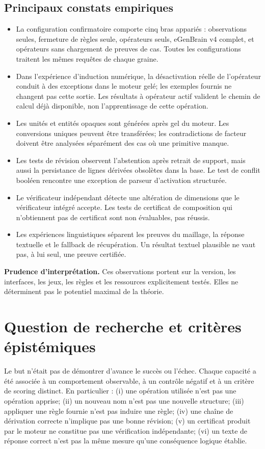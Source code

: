 \documentclass[11pt,a4paper]{article}
\begin{document}
\subsection{Principaux constats empiriques}
\begin{itemize}[leftmargin=*]
\item La configuration confirmatoire comporte cinq bras appariés : observations seules, fermeture de règles seule, opérateurs seuls, eGenBrain v4 complet, et opérateurs sans chargement de preuves de cas. Toutes les configurations traitent les mêmes requêtes de chaque graine.
\item Dans l’expérience d’induction numérique, la désactivation réelle de l’opérateur conduit à des exceptions dans le moteur gelé; les exemples fournis ne changent pas cette sortie. Les résultats à opérateur actif valident le chemin de calcul déjà disponible, non l’apprentissage de cette opération.
\item Les unités et entités opaques sont générées après gel du moteur. Les conversions uniques peuvent être transférées; les contradictions de facteur doivent être analysées séparément des cas où une primitive manque.
\item Les tests de révision observent l’abstention après retrait de support, mais aussi la persistance de lignes dérivées obsolètes dans la base. Le test de conflit booléen rencontre une exception de parseur d’activation structurée.
\item Le vérificateur indépendant détecte une altération de dimensions que le vérificateur intégré accepte. Les tests de certificat de composition qui n’obtiennent pas de certificat sont non évaluables, pas réussis.
\item Les expériences linguistiques séparent les preuves du maillage, la réponse textuelle et le fallback de récupération. Un résultat textuel plausible ne vaut pas, à lui seul, une preuve certifiée.
\end{itemize}
\textbf{Prudence d’interprétation.} Ces observations portent sur la version, les interfaces, les jeux, les règles et les ressources explicitement testés. Elles ne déterminent pas le potentiel maximal de la théorie.

\section{Question de recherche et critères épistémiques}
Le but n’était pas de démontrer d’avance le succès ou l’échec. Chaque capacité a été associée à un comportement observable, à un contrôle négatif et à un critère de scoring distinct. En particulier : (i) une opération utilisée n’est pas une opération apprise; (ii) un nouveau nom n’est pas une nouvelle structure; (iii) appliquer une règle fournie n’est pas induire une règle; (iv) une chaîne de dérivation correcte n’implique pas une bonne révision; (v) un certificat produit par le moteur ne constitue pas une vérification indépendante; (vi) un texte de réponse correct n’est pas la même mesure qu’une conséquence logique établie.
\end{document}
